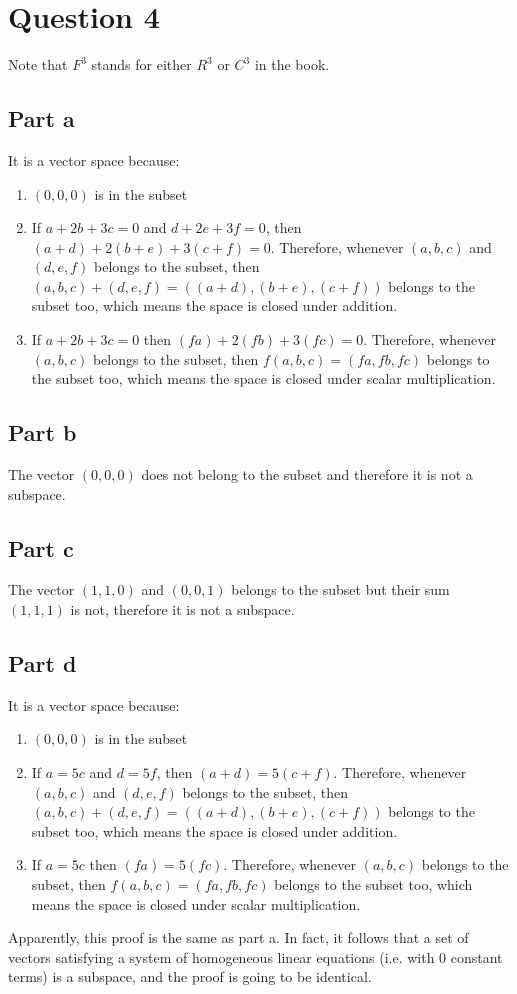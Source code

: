 \section*{Question 4}
Note that $ F^3 $ stands for either $ R^3 $ or $ C^3 $ in the book.
\subsection*{Part a}
It is a vector space because:
\begin{enumerate}
    \item {$ (0, 0, 0) $ is in the subset}
    \item { If $ a + 2b + 3c = 0 $ and $ d + 2e + 3f = 0 $, then $ (a + d) + 2(b + e) + 3 (c + f) = 0 $. Therefore, whenever $ (a,b,c) $ and $ (d,e,f) $ belongs to the subset, then $ (a,b,c) + (d,e,f) = ((a+d),(b+e),(c+f)) $ belongs to the subset too, which means the space is closed under addition.}
    \item { If $ a + 2b + 3c = 0 $ then $ (fa) + 2(fb) + 3(fc) = 0 $. Therefore, whenever $ (a,b,c) $ belongs to the subset, then $ f(a, b, c) = (fa, fb, fc) $ belongs to the subset too, which means the space is closed under scalar multiplication.}
\end{enumerate}

\subsection*{Part b}
The vector $ (0, 0, 0) $ does not belong to the subset and therefore it is not a subspace.

\subsection*{Part c}
The vector $ (1, 1, 0) $ and $ (0, 0, 1) $ belongs to the subset but their sum $ (1, 1, 1) $ is not, therefore it is not a subspace.

\subsection*{Part d}
It is a vector space because:
\begin{enumerate}
    \item {$ (0, 0, 0) $ is in the subset}
    \item { If $ a = 5c $ and $ d = 5f $, then $ (a + d) = 5(c + f) $. Therefore, whenever $ (a,b,c) $ and $ (d,e,f) $ belongs to the subset, then $ (a,b,c) + (d,e,f) = ((a+d),(b+e),(c+f)) $ belongs to the subset too, which means the space is closed under addition.}
    \item { If $ a = 5c $ then $ (fa) = 5(fc) $. Therefore, whenever $ (a,b,c) $ belongs to the subset, then $ f(a, b, c) = (fa, fb, fc) $ belongs to the subset too, which means the space is closed under scalar multiplication.}
\end{enumerate}

Apparently, this proof is the same as part a. In fact, it follows that a set of vectors satisfying a system of homogeneous linear equations (i.e. with 0 constant terms) is a subspace, and the proof is going to be identical. 